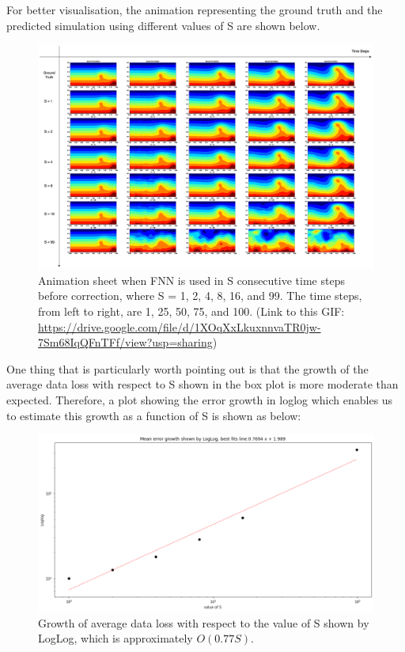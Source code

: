 For better visualisation, the animation representing the ground truth and the predicted simulation using different values of S are shown below.

\begin{figure}[H]
    \centering
    \caption{Animation sheet when FNN is used in S consecutive time steps before correction, where S = 1, 2, 4, 8, 16, and 99. The time steps, from left to right, are 1, 25, 50, 75, and 100. (Link to this GIF: \url{https://drive.google.com/file/d/1XOqXxLkuxnnvaTR0jw-7Sm68IqQFnTFf/view?usp=sharing})}
    \includegraphics[scale=0.30]{figures/mantle_convection_images/further_testings/FNN_further_testing_sheet.png}
\end{figure}

One thing that is particularly worth pointing out is that the growth of the average data loss with respect to S shown in the box plot is more moderate than expected. Therefore, a plot showing the error growth in loglog which enables us to estimate this growth as a function of S is shown as below:

\begin{figure}[H]
    \centering
    \includegraphics[scale=0.4]{figures/mantle_convection_images/further_testings/FNN_LogLog.png}
    \caption{Growth of average data loss with respect to the value of S shown by LogLog, which is approximately $O(0.77S)$.}
\end{figure}

